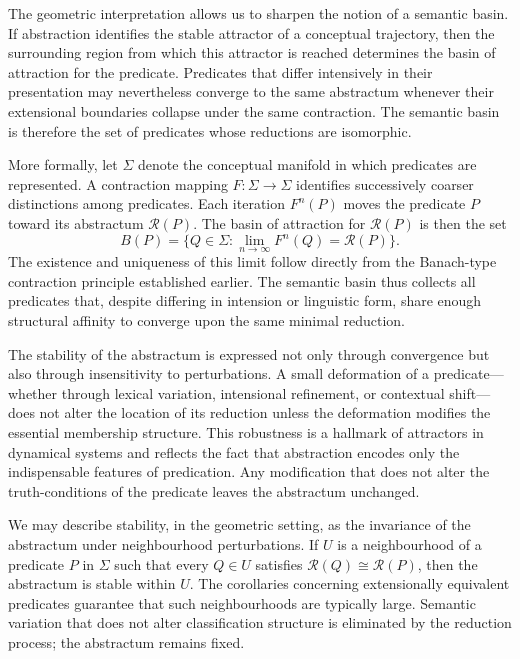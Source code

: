 \documentclass[12pt,letterpaper]{article}
\begin{document}
The geometric interpretation allows us to sharpen the notion of a semantic basin. If abstraction identifies the stable attractor of a conceptual trajectory, then the surrounding region from which this attractor is reached determines the basin of attraction for the predicate. Predicates that differ intensively in their presentation may nevertheless converge to the same abstractum whenever their extensional boundaries collapse under the same contraction. The semantic basin is therefore the set of predicates whose reductions are isomorphic.

More formally, let $\Sigma$ denote the conceptual manifold in which predicates are represented. A contraction mapping $F : \Sigma \to \Sigma$ identifies successively coarser distinctions among predicates. Each iteration $F^n(P)$ moves the predicate $P$ toward its abstractum $\mathcal{R}(P)$. The basin of attraction for $\mathcal{R}(P)$ is then the set
\[
B(P) = \{ Q \in \Sigma : \lim_{n \to \infty} F^n(Q) = \mathcal{R}(P) \}.
\]
The existence and uniqueness of this limit follow directly from the Banach-type contraction principle established earlier. The semantic basin thus collects all predicates that, despite differing in intension or linguistic form, share enough structural affinity to converge upon the same minimal reduction.

The stability of the abstractum is expressed not only through convergence but also through insensitivity to perturbations. A small deformation of a predicate—whether through lexical variation, intensional refinement, or contextual shift—does not alter the location of its reduction unless the deformation modifies the essential membership structure. This robustness is a hallmark of attractors in dynamical systems and reflects the fact that abstraction encodes only the indispensable features of predication. Any modification that does not alter the truth-conditions of the predicate leaves the abstractum unchanged.

We may describe stability, in the geometric setting, as the invariance of the abstractum under neighbourhood perturbations. If $U$ is a neighbourhood of a predicate $P$ in $\Sigma$ such that every $Q \in U$ satisfies $\mathcal{R}(Q) \cong \mathcal{R}(P)$, then the abstractum is stable within $U$. The corollaries concerning extensionally equivalent predicates guarantee that such neighbourhoods are typically large. Semantic variation that does not alter classification structure is eliminated by the reduction process; the abstractum remains fixed.
\end{document}
